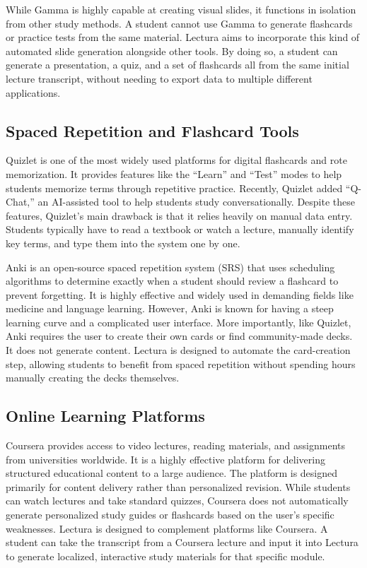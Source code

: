 While Gamma is highly capable at creating visual slides, it functions in isolation from other study methods. A student cannot use Gamma to generate flashcards or practice tests from the same material. Lectura aims to incorporate this kind of automated slide generation alongside other tools. By doing so, a student can generate a presentation, a quiz, and a set of flashcards all from the same initial lecture transcript, without needing to export data to multiple different applications.

\subsection{Spaced Repetition and Flashcard Tools}
Quizlet is one of the most widely used platforms for digital flashcards and rote memorization. It provides features like the ``Learn'' and ``Test'' modes to help students memorize terms through repetitive practice. Recently, Quizlet added ``Q-Chat,'' an AI-assisted tool to help students study conversationally. Despite these features, Quizlet's main drawback is that it relies heavily on manual data entry. Students typically have to read a textbook or watch a lecture, manually identify key terms, and type them into the system one by one.

Anki is an open-source spaced repetition system (SRS) that uses scheduling algorithms to determine exactly when a student should review a flashcard to prevent forgetting. It is highly effective and widely used in demanding fields like medicine and language learning. However, Anki is known for having a steep learning curve and a complicated user interface. More importantly, like Quizlet, Anki requires the user to create their own cards or find community-made decks. It does not generate content. Lectura is designed to automate the card-creation step, allowing students to benefit from spaced repetition without spending hours manually creating the decks themselves.

\subsection{Online Learning Platforms}
Coursera provides access to video lectures, reading materials, and assignments from universities worldwide. It is a highly effective platform for delivering structured educational content to a large audience. The platform is designed primarily for content delivery rather than personalized revision. While students can watch lectures and take standard quizzes, Coursera does not automatically generate personalized study guides or flashcards based on the user's specific weaknesses. Lectura is designed to complement platforms like Coursera. A student can take the transcript from a Coursera lecture and input it into Lectura to generate localized, interactive study materials for that specific module.

